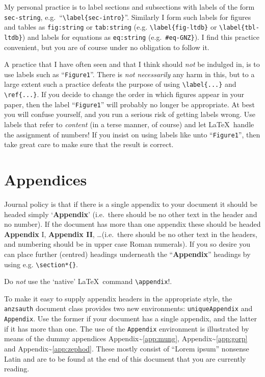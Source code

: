 \documentclass[
  times,
  doublespace]{anzsauth}
\begin{document}
My personal practice is to label sections and subsections with labels of
the form \texttt{sec-string},
e.g.~``\texttt{\textbackslash{}label\{sec-intro\}}''. Similarly I form
such labels for figures and tables as \texttt{fig:string} or
\texttt{tab:string} (e.g. \texttt{\textbackslash{}label\{fig-ltdb\}} or
\texttt{\textbackslash{}label\{tbl-ltdb\}}) and labels for equations as
\texttt{eq:string} (e.g.~\texttt{\#eq-GNZ\}}). I find this practice
convenient, but you are of course under no obligation to follow it.

A practice that I have often seen and that I think should \emph{not} be
indulged in, is to use labels such as ``\texttt{Figure1}''. There is
\emph{not necessarily} any harm in this, but to a large extent such a
practice defeats the purpose of using
\texttt{\textbackslash{}label\{...\}} and
\texttt{\textbackslash{}ref\{...\}}. If you decide to change the order
in which figures appear in your paper, then the label
``\texttt{Figure1}'' will probably no longer be appropriate. At best you
will confuse yourself, and you run a serious risk of getting labels
wrong. Use labels that refer to \emph{content} (in a terse manner, of
course) and let \LaTeX~handle the assignment of numbers! If you insist
on using labels like unto ``\texttt{Figure1}'', then take great care to
make sure that the result is correct.

\section{Appendices}\label{sec-append}

Journal policy is that if there is a single appendix to your document it
should be headed simply `\textbf{Appendix}' (i.e.~there should be no
other text in the header and no number). If the document has more than
one appendix these should be headed \textbf{Appendix} I,
\textbf{Appendix II}, \ldots (i.e.~there should be no other text in the
headers, and numbering should be in upper case Roman numerals). If you
so desire you can place further (centred) headings underneath the
``\textbf{Appendix}'' headings by using e.g.
\texttt{\textbackslash{}section*\{\}}.

Do \emph{not} use the `native' \LaTeX~command
\texttt{\textbackslash{}appendix}!.

To make it easy to supply appendix headers in the appropriate style, the
\texttt{anzsauth} document class provides two new environments:
\texttt{uniqueAppendix} and \texttt{Appendix}. Use the former if your
document has a single appendix, and the latter if it has more than one.
The use of the \texttt{Appendix} environment is illustrated by means of
the dummy appendices Appendix\textasciitilde{}\ref{app:mung},
Appendix\textasciitilde{}\ref{app:gorp} and
Appendix\textasciitilde{}\ref{app:zephod}. These mostly consist of
``Lorem ipsum'' nonsense Latin and are to be found at the end of this
document that you are currently reading.
\end{document}
